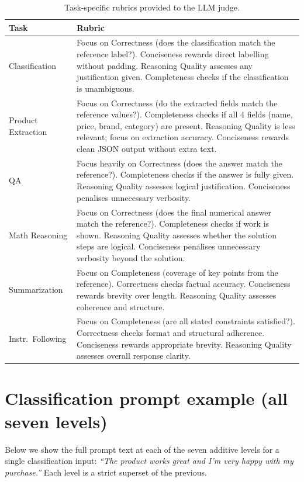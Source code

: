 \begin{table}[h]
\centering
\caption{Task-specific rubrics provided to the LLM judge.}
\label{tab:rubrics}
\small
\begin{tabular}{lp{10cm}}
\toprule
Task & Rubric \\
\midrule
Classification &
  Focus on Correctness (does the classification match the reference label?).
  Conciseness rewards direct labelling without padding.
  Reasoning Quality assesses any justification given.
  Completeness checks if the classification is unambiguous. \\
\addlinespace
Product Extraction &
  Focus on Correctness (do the extracted fields match the reference values?).
  Completeness checks if all 4 fields (name, price, brand, category) are present.
  Reasoning Quality is less relevant; focus on extraction accuracy.
  Conciseness rewards clean JSON output without extra text. \\
\addlinespace
QA &
  Focus heavily on Correctness (does the answer match the reference?).
  Completeness checks if the answer is fully given.
  Reasoning Quality assesses logical justification.
  Conciseness penalises unnecessary verbosity. \\
\addlinespace
Math Reasoning &
  Focus on Correctness (does the final numerical answer match the reference?).
  Completeness checks if work is shown.
  Reasoning Quality assesses whether the solution steps are logical.
  Conciseness penalises unnecessary verbosity beyond the solution. \\
\addlinespace
Summarization &
  Focus on Completeness (coverage of key points from the reference).
  Correctness checks factual accuracy.
  Conciseness rewards brevity over length.
  Reasoning Quality assesses coherence and structure. \\
\addlinespace
Instr.\ Following &
  Focus on Completeness (are all stated constraints satisfied?).
  Correctness checks format and structural adherence.
  Conciseness rewards appropriate brevity.
  Reasoning Quality assesses overall response clarity. \\
\bottomrule
\end{tabular}
\end{table}

\section{Classification prompt example (all seven levels)}
\label{app:example}

Below we show the full prompt text at each of the seven additive levels for
a single classification input: \textit{``The product works great and I'm very
happy with my purchase.''}
Each level is a strict superset of the previous.

